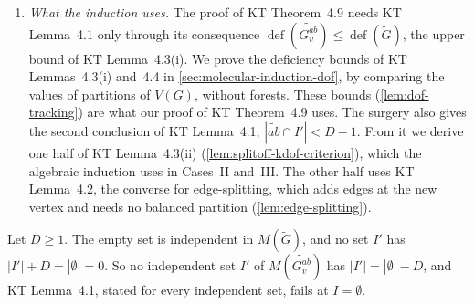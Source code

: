 \begin{remark}[On KT Lemma~4.1]
\begin{enumerate}
      On a balanced partition the surgery goes as Katoh and Tanigawa
      describe it. A forest with two edges $p_a \in \tilde e_a$ and
      $p_b \in \tilde e_b$ replaces them by one copy of $ab$
      (\cref{lem:reroute-cycle-lift}). A forest with one edge incident
      with $v$ loses it and gains nothing
      (\cref{lem:reroute-vfree-transport}). Each forest loses one edge,
      so $|I'| = |I| - D$: the $h$ edges incident with $v$ leave, and
      $h'$ copies of $ab$ enter. This count is the equation
      $2h' + (D - h') = h$. As $h \le 2(D - 1)$, it gives
      $h' \le D - 2$. So the $D - 1$ copies of $ab$ suffice for distinct
      forests to take distinct copies, and
      $|\widetilde{ab} \cap I'| = h' < D - 1$
      (\cref{lem:forest-surgery-count}). The count and KT eq.~(2.4)
      (\cref{thm:def-eq-corank}) give
      $\operatorname{def}(\widetilde{G_v^{ab}}) \le
      \operatorname{def}(\tilde G)$, which is
      \cref{lem:forest-surgery-split}.
    \item \emph{What the induction uses.} The proof of KT Theorem~4.9
      needs KT Lemma~4.1 only through its consequence
      $\operatorname{def}(\widetilde{G_v^{ab}}) \le
      \operatorname{def}(\tilde G)$, the upper bound of KT
      Lemma~4.3(i). We prove the deficiency bounds of KT Lemmas~4.3(i)
      and~4.4 in \cref{sec:molecular-induction-dof}, by comparing the
      values of partitions of $V(G)$, without forests. These bounds
      (\cref{lem:dof-tracking}) are what our proof of KT Theorem~4.9
      uses. The surgery also gives the second conclusion of KT Lemma~4.1,
      $|\widetilde{ab} \cap I'| < D - 1$. From it we derive one half of
      KT Lemma~4.3(ii) (\cref{lem:splitoff-kdof-criterion}), which the
      algebraic induction uses in Cases~II and~III. The other half uses
      KT Lemma~4.2, the converse for edge-splitting, which adds edges at
      the new vertex and needs no balanced partition
      (\cref{lem:edge-splitting}).
  \end{enumerate}
\end{remark}

\begin{example}[KT Lemma~4.1 fails for $I = \emptyset$]
  \label{ex:kt-41-overquantified}
  \leanok
  Let $D \ge 1$. The empty set is independent in $M(\tilde G)$, and no
  set $I'$ has $|I'| + D = |\emptyset| = 0$. So no independent set $I'$
  of $M(\widetilde{G_v^{ab}})$ has $|I'| = |\emptyset| - D$, and KT
  Lemma~4.1, stated for every independent set, fails at
  $I = \emptyset$.
\end{example}

